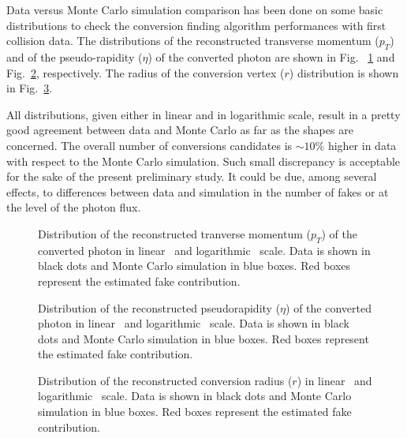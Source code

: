 Data versus Monte Carlo simulation comparison has been done on some basic distributions to check the conversion finding algorithm performances with first collision data. The distributions of the reconstructed transverse momentum ($p_T$) and of the pseudo-rapidity ($\eta$) of the converted photon are shown in Fig. ~\ref{fig:pt} and Fig.~\ref{fig:eta}, respectively. The radius of the conversion vertex ($r$) distribution is shown in Fig.~\ref{fig:r}. 

All distributions, given either in linear and in logarithmic scale, result in a pretty good agreement between data and Monte Carlo as far as the shapes are concerned. The overall number of conversions candidates is $\sim10\%$ higher in data with respect to the Monte Carlo simulation. Such small discrepancy is acceptable for the sake of the present preliminary study. It could be due, among several effects, to differences between data and simulation in the number of fakes or at the level of the photon flux.
\begin{figure}[!hbtp]
\centering
{}
\caption{Distribution of the reconstructed tranverse momentum ($p_T$) of the converted photon in linear~ and logarithmic~ scale. Data is shown in black dots and Monte Carlo  simulation in blue boxes. Red boxes represent the estimated fake contribution.}
\label{fig:pt}
\end{figure}

\begin{figure}[!hbtp]
\centering
{}
\caption{Distribution of the reconstructed pseudorapidity ($\eta$) of the converted photon in linear~ and logarithmic~ scale. Data is shown in black dots and Monte Carlo  simulation in blue boxes. Red boxes represent the estimated fake contribution.}
\label{fig:eta}
\end{figure}

\begin{figure}[!hbtp]
\centering
{}
\caption{Distribution of the reconstructed conversion radius ($r$) in linear~ and logarithmic~ scale. Data is shown in black dots and Monte Carlo simulation in blue boxes. Red boxes represent the estimated fake contribution.}
\label{fig:r}
\end{figure}
